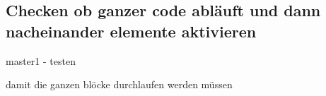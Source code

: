 \subsection{Checken ob ganzer code abläuft und dann nacheinander elemente aktivieren}\label{subsection:basic-flow}
master1 - testen\newline

damit die ganzen blöcke durchlaufen werden müssen
